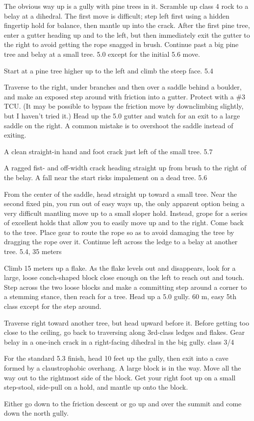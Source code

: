 \documentclass{tahquitz}
\begin{document}
 The obvious way up is a gully with pine trees in it. Scramble up
class 4 rock to a belay at a dihedral. The first move is difficult;
step left first using a hidden fingertip hold for balance, then mantle
up into the crack.
After the first pine tree, enter a gutter heading up
and to the left, but then immediately exit the gutter to the right to
avoid getting the rope snagged in brush. Continue past a big pine
tree and belay at a small tree. 5.0 except for the initial 5.6
move.

 Start at a pine tree higher up to the left and climb
the steep face. 5.4

 Traverse to the right, under branches and then over a saddle behind a boulder, and make
an exposed step around with friction into a gutter.  Protect with a
\#3 TCU. (It may be possible to bypass the friction move by downclimbing
slightly, but I haven't tried it.) Head up the 5.0 gutter and watch for an exit to a large saddle
on the right. A common mistake is to overshoot the saddle instead of
exiting.

 A clean straight-in hand and foot crack just left of the small
tree. 5.7

 A ragged fist- and off-width crack heading straight up from brush
to the right of the belay. A fall near the start risks impalement on a dead tree. 5.6

 From the center of the saddle, head straight up toward a small
tree. Near the second fixed pin, you run out of easy ways up, the
only apparent option being a very difficult mantling move up to a
small sloper hold. Instead, grope for a series of excellent holds that allow
you to easily move up and to the right. Come back to the tree. Place
gear to route the rope so as to avoid damaging the tree by dragging
the rope over it. Continue left across the ledge to a belay at
another tree. 5.4, 35 meters

 Climb 15 meters up a flake. As the flake levels out and
disappears, look for a large, loose conch-shaped block close enough
on the left to reach out and touch. Step across the two loose blocks and
make a committing step around a corner to a stemming stance, then
reach for a tree. Head up a 5.0 gully. 60 m, easy 5th class except for
the step around.

 Traverse right toward another tree, but head upward before
it.  Before getting too close to the ceiling, go back to traversing
along 3rd-class ledges and flakes.  Gear belay in a one-inch
crack in a right-facing dihedral in the big gully. class 3/4

 For the standard 5.3 finish, head 10 feet up the gully,
then exit into a cave formed by a claustrophobic overhang. 
A large block is in the way.
Move all the way out to the rightmost side of
the block. Get your right foot up on a small step-stool,
side-pull on a hold, and mantle up onto the block.

Either go down to the friction descent or go up and over the summit
and come down the north gully.

\myfooter\vfill %
\end{document}
